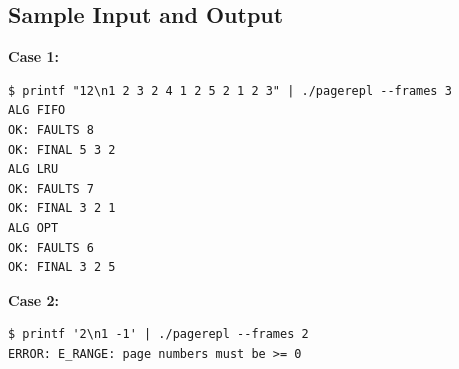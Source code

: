 \subsection{Sample Input and Output}

\textbf{Case 1:}
\begin{verbatim}
$ printf "12\n1 2 3 2 4 1 2 5 2 1 2 3" | ./pagerepl --frames 3
ALG FIFO
OK: FAULTS 8
OK: FINAL 5 3 2
ALG LRU
OK: FAULTS 7
OK: FINAL 3 2 1
ALG OPT
OK: FAULTS 6
OK: FINAL 3 2 5
\end{verbatim}

\textbf{Case 2:}
\begin{verbatim}
$ printf '2\n1 -1' | ./pagerepl --frames 2
ERROR: E_RANGE: page numbers must be >= 0
\end{verbatim}